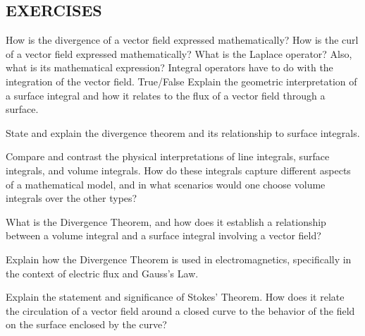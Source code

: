 \begin{mdframed}[ backgroundcolor=lightblue, linewidth=1pt, hidealllines=true]
\section{EXERCISES}
\begin{ExerciseList}
\Exercise[label={ex171}] 
How is the divergence of a vector field expressed mathematically?
\Exercise[label={ex172}] 
How is the curl of a vector field expressed mathematically?
\Exercise[label={ex173}] 
What is the Laplace operator? Also, what is its mathematical expression?
\Exercise[label={ex174}]  Integral operators have to do with the integration of the vector field. True/False
\Exercise[label={ex175}]
Explain the geometric interpretation of a surface integral and how it relates to the flux of a vector field through a surface.


\Exercise[label={ex176}]
State and explain the divergence theorem and its relationship to surface integrals.


\Exercise[label={ex178}] 
Compare and contrast the physical interpretations of line integrals, surface integrals, and volume integrals. How do these integrals capture different aspects of a mathematical model, and in what scenarios would one choose volume integrals over the other types?


\Exercise[label={ex179}] 
What is the Divergence Theorem, and how does it establish a relationship between a volume integral and a surface integral involving a vector field?

\Exercise[label={ex1710}] 
Explain how the Divergence Theorem is used in electromagnetics, specifically in the context of electric flux and Gauss's Law.



\Exercise[label={ex1712}] 
Explain the statement and significance of Stokes' Theorem. How does it relate the circulation of a vector field around a closed curve to the behavior of the field on the surface enclosed by the curve?


\end{ExerciseList}
\end{mdframed}
